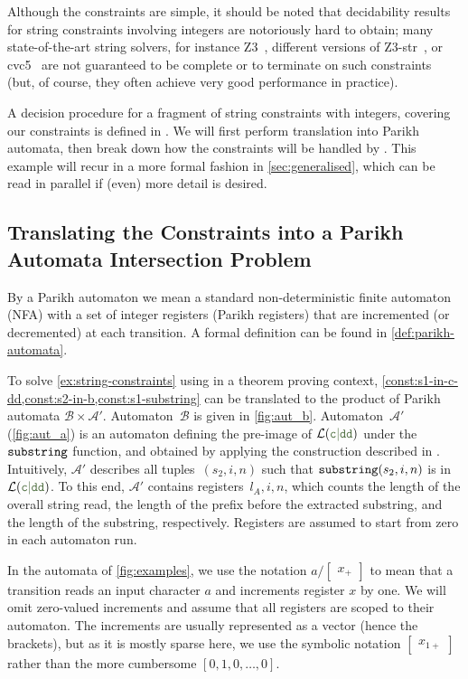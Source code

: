 Although the constraints are simple, it should be noted that
decidability results for string constraints involving integers are
notoriously hard to obtain; many state-of-the-art string solvers, for
instance Z3~\cite{Z3}, different versions of
Z3-str~\cite{Z3-str,DBLP:conf/fm/MoraBKNG21}, or
cvc5~\cite{cvc5}
are not guaranteed to be complete or to terminate on such constraints
(but, of course, they often achieve very good performance in practice).

A decision procedure for a fragment of string constraints with integers,
covering our constraints is defined in
\cite{ostrich-plus}.
%
We will first perform translation into Parikh
automata, then break down how the constraints will be handled by \Calculus{}.
This example will recur in a more formal fashion in \cref{sec:generalised},
which can be read in parallel if (even) more detail is desired.

\subsection{Translating the Constraints into a Parikh Automata Intersection Problem}

By a Parikh automaton we mean a standard non-deterministic finite automaton
(NFA) with a set of integer registers (Parikh registers) that are incremented
(or decremented) at each transition. A formal definition can be found in
\cref{def:parikh-automata}.

To solve \cref{ex:string-constraints} using \Calculus{} in a theorem
proving context,
\cref{const:s1-in-c-dd,const:s2-in-b,const:s1-substring} can be
translated to the product of Parikh automata $\mathcal{B} \times
\mathcal{A}'$. Automaton~$\mathcal{B}$ is given in \cref{fig:aut_b}.  Automaton~$\mathcal{A}'$
(\cref{fig:aut_a}) is an automaton defining the pre-image of
$\Language(\Regex{c\RegexOr{}dd})$ under the $\operatorname{\mathtt{substring}}$ function,
and obtained by applying the construction described in
\cite{ostrich-plus}. Intuitively, $\mathcal{A}'$ describes all
tuples~$(s_2, i, n)$ such that $\operatorname{\mathtt{substring}}(s_2, i, n)$ is in
$\Language(\Regex{c\RegexOr{}dd})$. To this end, $\mathcal{A}'$ contains
registers~$l_A, i, n$, which counts the length of the overall string
read, the length of the prefix before the extracted substring, and the
length of the substring, respectively. Registers are assumed to start
from zero in each automaton run.

In the automata of \cref{fig:examples}, we use the notation $a /
\begin{bmatrix} x_+ \end{bmatrix}$ to mean that a transition reads an input
character $a$ and increments register $x$ by one. We will omit zero-valued
increments and assume that all registers are scoped to their automaton. The
increments are usually represented as a vector (hence the brackets), but as it
is mostly sparse here, we use the symbolic notation $\begin{bmatrix} x_{1+}
\end{bmatrix}$ rather than the more cumbersome $\left[ 0, 1,  0 , \ldots, 0
\right]$.

